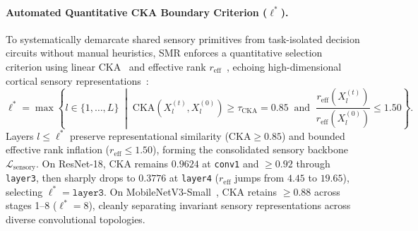 \documentclass{article}
\begin{document}
\paragraph{Automated Quantitative CKA Boundary Criterion ($\ell^*$).}
To systematically demarcate shared sensory primitives from task-isolated decision circuits without manual heuristics, SMR enforces a quantitative selection criterion using linear CKA~\cite{kornblith2019similarity} and effective rank $r_{\mathrm{eff}}$~\cite{roy2007effective}, echoing high-dimensional cortical sensory representations~\cite{stringer2019high}:
\begin{equation}
\label{eq:app_cka_selection}
    \ell^* = \max \left\{ l \in \{1, \dots, L\} \;\middle|\; \mathrm{CKA}\left(X_l^{(t)}, X_l^{(0)}\right) \ge \tau_{\mathrm{CKA}} = 0.85 \;\;\text{and}\;\; \frac{r_{\mathrm{eff}}(X_l^{(t)})}{r_{\mathrm{eff}}(X_l^{(0)})} \le 1.50 \right\}.
\end{equation}
Layers $l \le \ell^*$ preserve representational similarity ($\mathrm{CKA} \ge 0.85$) and bounded effective rank inflation ($r_{\mathrm{eff}} \le 1.50$), forming the consolidated sensory backbone $\mathcal{L}_{\mathrm{sensory}}$. On ResNet-18, $\mathrm{CKA}$ remains $0.9624$ at \texttt{conv1} and $\ge 0.92$ through \texttt{layer3}, then sharply drops to $0.3776$ at \texttt{layer4} ($r_{\mathrm{eff}}$ jumps from $4.45$ to $19.65$), selecting $\ell^* = \mathtt{layer3}$. On MobileNetV3-Small~\cite{howard2019searching}, CKA retains $\ge 0.88$ across stages 1--8 ($\ell^* = 8$), cleanly separating invariant sensory representations across diverse convolutional topologies.
\end{document}
